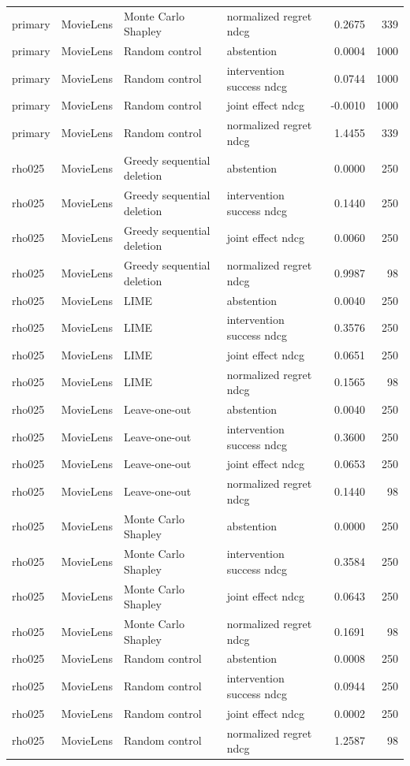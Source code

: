 \begin{longtable}{@{}p{}p{}p{}p{}rr@{}}
primary & MovieLens & Monte Carlo Shapley & normalized regret ndcg & 0.2675 & 339 \\
primary & MovieLens & Random control & abstention & 0.0004 & 1000 \\
primary & MovieLens & Random control & intervention success ndcg & 0.0744 & 1000 \\
primary & MovieLens & Random control & joint effect ndcg & -0.0010 & 1000 \\
primary & MovieLens & Random control & normalized regret ndcg & 1.4455 & 339 \\
rho025 & MovieLens & Greedy sequential deletion & abstention & 0.0000 & 250 \\
rho025 & MovieLens & Greedy sequential deletion & intervention success ndcg & 0.1440 & 250 \\
rho025 & MovieLens & Greedy sequential deletion & joint effect ndcg & 0.0060 & 250 \\
rho025 & MovieLens & Greedy sequential deletion & normalized regret ndcg & 0.9987 & 98 \\
rho025 & MovieLens & LIME & abstention & 0.0040 & 250 \\
rho025 & MovieLens & LIME & intervention success ndcg & 0.3576 & 250 \\
rho025 & MovieLens & LIME & joint effect ndcg & 0.0651 & 250 \\
rho025 & MovieLens & LIME & normalized regret ndcg & 0.1565 & 98 \\
rho025 & MovieLens & Leave-one-out & abstention & 0.0040 & 250 \\
rho025 & MovieLens & Leave-one-out & intervention success ndcg & 0.3600 & 250 \\
rho025 & MovieLens & Leave-one-out & joint effect ndcg & 0.0653 & 250 \\
rho025 & MovieLens & Leave-one-out & normalized regret ndcg & 0.1440 & 98 \\
rho025 & MovieLens & Monte Carlo Shapley & abstention & 0.0000 & 250 \\
rho025 & MovieLens & Monte Carlo Shapley & intervention success ndcg & 0.3584 & 250 \\
rho025 & MovieLens & Monte Carlo Shapley & joint effect ndcg & 0.0643 & 250 \\
rho025 & MovieLens & Monte Carlo Shapley & normalized regret ndcg & 0.1691 & 98 \\
rho025 & MovieLens & Random control & abstention & 0.0008 & 250 \\
rho025 & MovieLens & Random control & intervention success ndcg & 0.0944 & 250 \\
rho025 & MovieLens & Random control & joint effect ndcg & 0.0002 & 250 \\
rho025 & MovieLens & Random control & normalized regret ndcg & 1.2587 & 98 \\
\end{longtable}